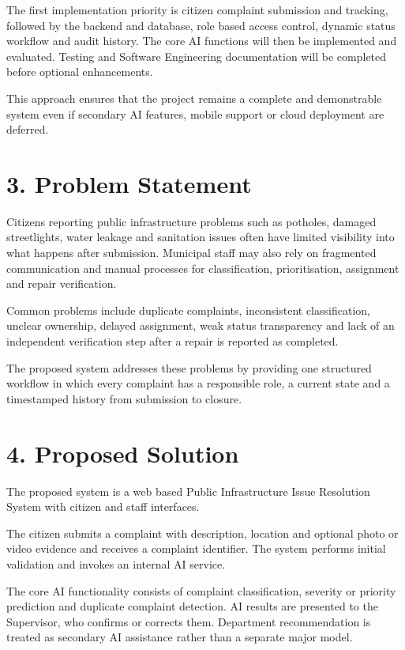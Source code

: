 \documentclass[12pt,a4paper]{article}
\begin{document}
The first implementation priority is citizen complaint submission and tracking, followed by the backend and database, role based access control, dynamic status workflow and audit history. The core AI functions will then be implemented and evaluated. Testing and Software Engineering documentation will be completed before optional enhancements.

This approach ensures that the project remains a complete and demonstrable system even if secondary AI features, mobile support or cloud deployment are deferred.

\section{3. Problem Statement}
Citizens reporting public infrastructure problems such as potholes, damaged streetlights, water leakage and sanitation issues often have limited visibility into what happens after submission. Municipal staff may also rely on fragmented communication and manual processes for classification, prioritisation, assignment and repair verification.

Common problems include duplicate complaints, inconsistent classification, unclear ownership, delayed assignment, weak status transparency and lack of an independent verification step after a repair is reported as completed.

The proposed system addresses these problems by providing one structured workflow in which every complaint has a responsible role, a current state and a timestamped history from submission to closure.

\section{4. Proposed Solution}
The proposed system is a web based Public Infrastructure Issue Resolution System with citizen and staff interfaces.

The citizen submits a complaint with description, location and optional photo or video evidence and receives a complaint identifier. The system performs initial validation and invokes an internal AI service.

The core AI functionality consists of complaint classification, severity or priority prediction and duplicate complaint detection. AI results are presented to the Supervisor, who confirms or corrects them. Department recommendation is treated as secondary AI assistance rather than a separate major model.
\end{document}
